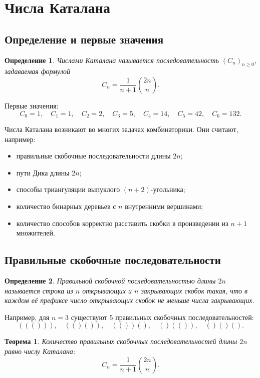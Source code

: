 \documentclass[12pt,a4paper]{article}
\newtheorem{theorem}{Теорема}
\newtheorem{definition}{Определение}
\begin{document}
\section{Числа Каталана}

\subsection{Определение и первые значения}

\begin{definition}
Числами Каталана называется последовательность $(C_n)_{n\ge 0}$, задаваемая формулой
\[
C_n=\frac{1}{n+1}\binom{2n}{n}.
\]
\end{definition}

Первые значения:
\[
C_0=1,\quad
C_1=1,\quad
C_2=2,\quad
C_3=5,\quad
C_4=14,\quad C_5=42,\quad C_6=132.
\]

Числа Каталана возникают во многих задачах комбинаторики. Они считают, например:
\begin{itemize}
    \item правильные скобочные последовательности длины $2n$;
    \item пути Дика длины $2n$;
    \item способы триангуляции выпуклого $(n+2)$-угольника;
    \item количество бинарных деревьев с $n$ внутренними вершинами;
    \item количество способов корректно расставить скобки в произведении из $n+1$ множителей.
\end{itemize}

\subsection{Правильные скобочные последовательности}

\begin{definition}
Правильной скобочной последовательностью длины $2n$ называется строка из $n$ открывающих и $n$ закрывающих скобок такая, что в каждом её префиксе число открывающих скобок не меньше числа закрывающих.
\end{definition}

Например, для $n=3$ существуют $5$ правильных скобочных последовательностей:
\[
((())),\quad (()()),\quad (())(),\quad ()(()),\quad ()()().
\]

\begin{theorem}
Количество правильных скобочных последовательностей длины $2n$ равно числу Каталана:
\[
C_n=\frac{1}{n+1}\binom{2n}{n}.
\]
\end{theorem}
\end{document}
